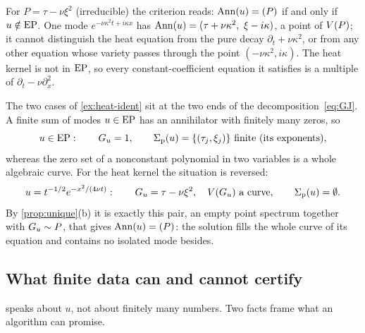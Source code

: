 \begin{example}\label{ex:heat-ident}
For $P=\tau-\nu\xi^2$ (irreducible) the criterion reads: $\operatorname{Ann}(u)=(P)$ if and only if $u\notin\mathrm{EP}$.
One mode $e^{-\nu\kappa^2t+i\kappa x}$ has $\Ann(u)=(\tau+\nu\kappa^2,\ \xi-i\kappa)$, a point of
$V(P)$; it cannot distinguish the heat equation from the pure decay $\partial_t+\nu\kappa^2$, or from
any other equation whose variety passes through the point $(-\nu\kappa^2,i\kappa)$. The heat kernel is not in $\mathrm{EP}$, so every
constant-coefficient equation it satisfies is a multiple of $\partial_t-\nu\partial_x^2$.
\end{example}

\begin{remark}\label{rem:curves-points}
The two cases of \cref{ex:heat-ident} sit at the two ends of the decomposition~\eqref{eq:GJ}. A finite sum of modes
$u\in\mathrm{EP}$ has an annihilator with finitely many zeros, so
\[
  u\in\mathrm{EP}:\qquad G_u=1,\qquad \Sigma_{\mathrm p}(u)=\{(\tau_j,\xi_j)\}\ \text{finite (its exponents)},
\]
whereas the zero set of a nonconstant polynomial in two variables is a whole algebraic curve. For the heat kernel
the situation is reversed:
\[
  u=t^{-1/2}e^{-x^2/(4\nu t)}:\qquad G_u=\tau-\nu\xi^2,\quad V(G_u)\ \text{a curve},\qquad \Sigma_{\mathrm p}(u)=\emptyset .
\]
By \cref{prop:unique}(b) it is exactly this pair, an empty point spectrum together with $G_u\sim P$, that gives
$\operatorname{Ann}(u)=(P)$: the solution fills the whole curve of its equation and contains no isolated mode besides.
\end{remark}


\subsection{What finite data can and cannot certify}\label{sec:certify}\label{ch:data}
 speaks about $u$, not about finitely many numbers. Two facts frame what an algorithm
can promise.

